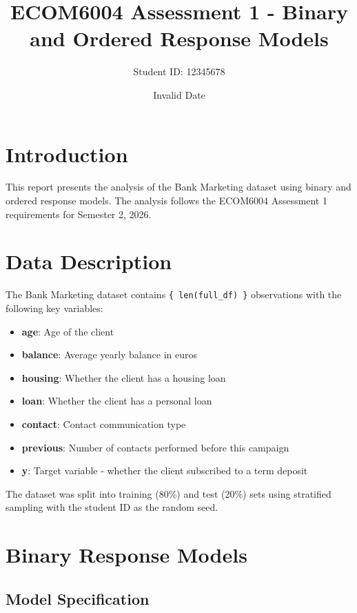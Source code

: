 \documentclass[
  letterpaper,
  DIV=11,
  numbers=noendperiod]{scrartcl}
\title{ECOM6004 Assessment 1 - Binary and Ordered Response Models}
\author{Student ID: 12345678}
\date{Invalid Date}
\providecommand{\tightlist}{%
  \setlength{\itemsep}{0pt}\setlength{\parskip}{0pt}}
\renewcommand*\contentsname{Table of contents}
\newcommand\contentsname{Table of contents}
\begin{document}
\maketitle

\renewcommand*\contentsname{Table of contents}
{
\setcounter{tocdepth}{2}
\tableofcontents
}

\section{Introduction}\label{introduction}

This report presents the analysis of the Bank Marketing dataset using
binary and ordered response models. The analysis follows the ECOM6004
Assessment 1 requirements for Semester 2, 2026.

\section{Data Description}\label{data-description}

The Bank Marketing dataset contains \texttt{\{\ len(full\_df)\ \}}
observations with the following key variables:

\begin{itemize}
\tightlist
\item
  \textbf{age}: Age of the client
\item
  \textbf{balance}: Average yearly balance in euros
\item
  \textbf{housing}: Whether the client has a housing loan
\item
  \textbf{loan}: Whether the client has a personal loan
\item
  \textbf{contact}: Contact communication type
\item
  \textbf{previous}: Number of contacts performed before this campaign
\item
  \textbf{y}: Target variable - whether the client subscribed to a term
  deposit
\end{itemize}

The dataset was split into training (80\%) and test (20\%) sets using
stratified sampling with the student ID as the random seed.

\section{Binary Response Models}\label{binary-response-models}

\subsection{Model Specification}\label{model-specification}
\end{document}

